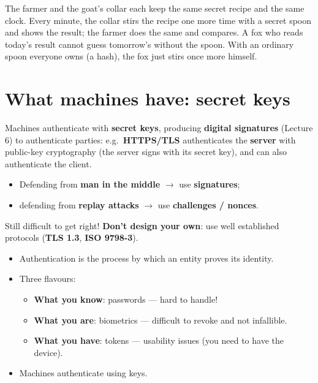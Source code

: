 \begin{goatbox}
The farmer and the goat's collar each keep the same secret recipe and the same clock. Every minute,
the collar stirs the recipe one more time with a secret spoon and shows the result; the farmer does
the same and compares. A fox who reads today's result cannot guess tomorrow's without the spoon.
With an ordinary spoon everyone owns (a hash), the fox just stirs once more himself.
\end{goatbox}

\section{What machines have: secret keys}

\begin{defnbox}[title=Machine authentication]
Machines authenticate with \textbf{secret keys}, producing \textbf{digital signatures} (Lecture 6)
to authenticate parties: e.g.\ \textbf{HTTPS/TLS} authenticates the \textbf{server} with
public-key cryptography (the server signs with its secret key), and can also authenticate the
client.
\end{defnbox}

\begin{keybox}[title={Building authentication protocols is hard!}]
\begin{itemize}
  \item Defending from \textbf{man in the middle} $\to$ use \textbf{signatures};
  \item defending from \textbf{replay attacks} $\to$ use \textbf{challenges / nonces}.
\end{itemize}
Still difficult to get right! \textbf{Don't design your own}: use well established protocols
(\textbf{TLS 1.3}, \textbf{ISO 9798-3}).
\end{keybox}

\begin{keybox}[title=Summary of the lecture]
\begin{itemize}
  \item Authentication is the process by which an entity proves its identity.
  \item Three flavours:
        \begin{itemize}
          \item \textbf{What you know}: passwords --- hard to handle!
          \item \textbf{What you are}: biometrics --- difficult to revoke and not infallible.
          \item \textbf{What you have}: tokens --- usability issues (you need to have the device).
        \end{itemize}
  \item Machines authenticate using keys.
\end{itemize}
\end{keybox}

